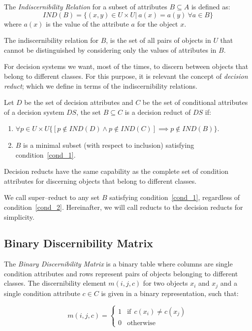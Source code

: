 \documentclass[authoryear,preprint,review,12pt]{elsarticle}
\begin{document}
  The \textit{Indiscernibility Relation} for a subset of attributes $B \subseteq A$ is defined as:
  $$IND(B) = \lbrace (x,y)\in U\times U|~a(x)=a(y)~\forall a \in B \rbrace $$
  where $a(x)$ is the value of the attribute $a$ for the object $x$.
  
  The indiscernibility relation for $B$, is the set of all pairs of objects in $U$ that cannot be distinguished by considering only the values of attributes in $B$. 
  
  For decision systems we want, most of the times, to discern between objects that belong to different classes. For this purpose, it is relevant the concept of \textit{decision reduct}; which we define in terms of the indiscernibility relations. 
  
  Let $D$ be the set of decision attributes and $C$ be the set of conditional attributes of a decision system $DS$, the set $B \subseteq C$ is a decision reduct of $DS$ if:
  \begin{enumerate}
   	\item $\forall p \in U\times U \lbrace [p \notin IND(D) \wedge p \notin IND(C)] \implies p \notin IND(B)\rbrace$. \label{cond_1}
   	\item $B$ is a minimal subset (with respect to inclusion) satisfying condition~\ref{cond_1}.\label{cond_2}
  \end{enumerate}
  
  Decision reducts have the same capability as the complete set of condition attributes for discerning objects that belong to different classes.
   
  We call super--reduct to any set $B$ satisfying condition~\ref{cond_1}, regardless of condition~\ref{cond_2}. Hereinafter, we will call reducts to the decision reducts for simplicity.
  
%  
\subsection{Binary Discernibility Matrix}\label{sect_SBDM}
  The \textit{Binary Discernibility Matrix} is a binary table where columns are single condition attributes and rows represent pairs of objects belonging to different classes. The discernibility element $m(i, j, c)$ for two objects $x_i$ and $x_j$ and a single condition attribute $c \in C$ is given in a binary representation, such that:
  
  \begin{equation}
  	m(i, j, c)=\left\lbrace\begin{array}{cl}
  			1 & \mathrm{if~~}c(x_i) \neq c(x_j) \\
  			0 								   & \mathrm{otherwise} 
  	\end{array}\right.
  \end{equation} 
  
\end{document}
